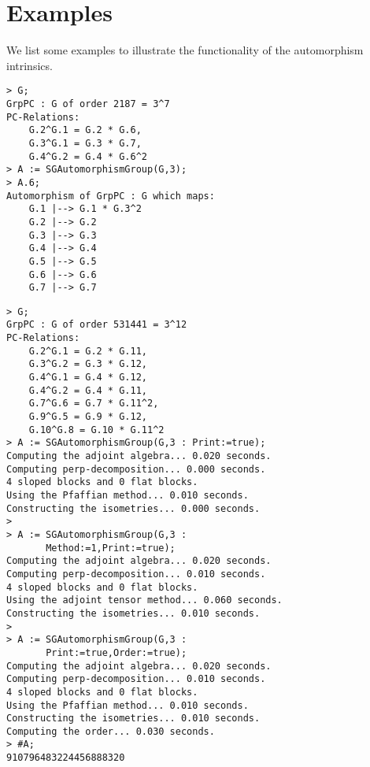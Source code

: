 \documentclass{documentation}
\begin{document}
\section{Examples}
We list some examples to illustrate the functionality of the automorphism intrinsics.

\begin{lstlisting}[frame=single,basicstyle=\ttfamily\color{black!30!teal},backgroundcolor=\color{white!70!gray}]
> G;
GrpPC : G of order 2187 = 3^7
PC-Relations:
    G.2^G.1 = G.2 * G.6, 
    G.3^G.1 = G.3 * G.7, 
    G.4^G.2 = G.4 * G.6^2
> A := SGAutomorphismGroup(G,3);
> A.6;
Automorphism of GrpPC : G which maps:
    G.1 |--> G.1 * G.3^2
    G.2 |--> G.2
    G.3 |--> G.3
    G.4 |--> G.4
    G.5 |--> G.5
    G.6 |--> G.6
    G.7 |--> G.7
\end{lstlisting}


\begin{lstlisting}[frame=single,basicstyle=\ttfamily\color{black!30!teal},backgroundcolor=\color{white!70!gray}]
> G;
GrpPC : G of order 531441 = 3^12
PC-Relations:
    G.2^G.1 = G.2 * G.11, 
    G.3^G.2 = G.3 * G.12, 
    G.4^G.1 = G.4 * G.12, 
    G.4^G.2 = G.4 * G.11, 
    G.7^G.6 = G.7 * G.11^2, 
    G.9^G.5 = G.9 * G.12, 
    G.10^G.8 = G.10 * G.11^2
> A := SGAutomorphismGroup(G,3 : Print:=true);
Computing the adjoint algebra... 0.020 seconds.
Computing perp-decomposition... 0.000 seconds.
4 sloped blocks and 0 flat blocks.
Using the Pfaffian method... 0.010 seconds.
Constructing the isometries... 0.000 seconds.
>
> A := SGAutomorphismGroup(G,3 : 
       Method:=1,Print:=true);
Computing the adjoint algebra... 0.020 seconds.
Computing perp-decomposition... 0.010 seconds.
4 sloped blocks and 0 flat blocks.
Using the adjoint tensor method... 0.060 seconds.
Constructing the isometries... 0.010 seconds.
>
> A := SGAutomorphismGroup(G,3 : 
       Print:=true,Order:=true);
Computing the adjoint algebra... 0.020 seconds.
Computing perp-decomposition... 0.010 seconds.
4 sloped blocks and 0 flat blocks.
Using the Pfaffian method... 0.010 seconds.
Constructing the isometries... 0.010 seconds.
Computing the order... 0.030 seconds.
> #A;
910796483224456888320
\end{lstlisting}
\end{document}
